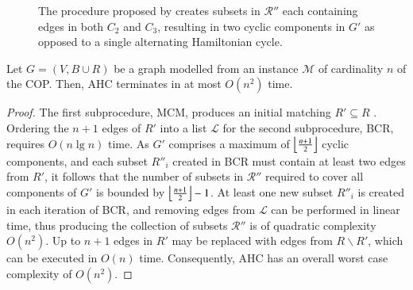 \documentclass[authoryear]{elsarticle}
\begin{document}
\begin{figure}[H]
	\centering	
	\begin{subfigure}[h]{0.35\textwidth}
		
		\caption{}
		\label{fig:bcrerror}
	\end{subfigure} \hspace{5mm}
	\begin{subfigure}[h]{0.25\textwidth}
		
		\caption{}
		\label{fig:mpsconnecterror}
	\end{subfigure} \hspace{5mm}
	\begin{subfigure}[h]{0.25\textwidth}
		
		\caption{}
		\label{fig:mpscycleerror}
	\end{subfigure}
	\caption{The procedure proposed by \citet{becker2010} creates subsets in $\mathcal{R}''$ each containing edges in both $C_2$ and $C_3$, resulting in two cyclic components in $G'$ as opposed to a single alternating Hamiltonian cycle.}	
	\label{fig:overlaperror}
\end{figure}

\begin{theorem}
	\label{thm:ahc}
	Let $G=(V, B \cup R)$ be a graph modelled from an instance $\mathcal{M}$ of cardinality $n$ of the COP. Then, AHC terminates in at most $O(n^2)$ time.
\end{theorem}

\begin{proof}
	The first subprocedure, MCM, produces an initial matching $R' \subseteq R$ . Ordering the $n+1$ edges of $R'$ into a list $\mathcal{L}$ for the second subprocedure, BCR,  requires $O(n\lg n)$ time. As $G'$ comprises a maximum of $\floor*{\frac{n+1}{2}}$ cyclic components, and each subset $R''_i$ created in BCR must contain at least two edges from $R'$, it follows that the number of subsets in $\mathcal{R}''$ required to cover all components of $G'$ is bounded by $\floor*{\frac{n+1}{2}}-1$. At least one new subset $R''_i$ is created in each iteration of BCR, and removing edges from $\mathcal{L}$ can be performed in linear time, thus producing the collection of subsets $\mathcal{R}''$ is of quadratic complexity $O(n^2)$. Up to $n+1$ edges in $R'$ may be replaced with edges from $R \backslash R'$, which can be executed in $O(n)$ time. Consequently, AHC has an overall worst case complexity of $O(n^2)$.
\end{proof}	
\end{document}
